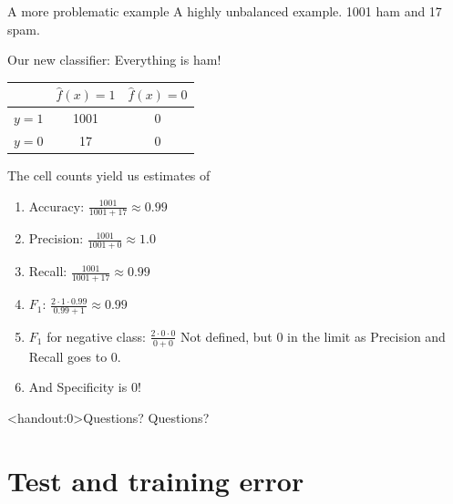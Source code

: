 \documentclass[10pt]{beamer}
\begin{document}
\begin{frame}{A more problematic example}
A highly unbalanced example. 1001 ham and 17 spam.

Our new classifier: Everything is ham!\pause

\begin{center}
\begin{tabular}{ l | c | c }
  & $\hat{f}(x)=1$ & $\hat{f}(x)=0$\\
  \hline
  $y=1$ & 1001 & 0 \\
  $y=0$ & 17 & 0 \\
  \hline
\end{tabular}
\end{center}
\pause
The cell counts yield us estimates of
\begin{enumerate}
\item Accuracy: $\frac{1001}{1001+17}\approx 0.99$
\item Precision: $\frac{1001}{1001+0}\approx 1.0$
\item Recall: $\frac{1001}{1001+17}\approx 0.99$
\item $F_1$: $\frac{2 \cdot 1 \cdot 0.99}{0.99 + 1}\approx 0.99$
\pause
\item $F_1$ for negative class: $\frac{2 \cdot 0 \cdot 0}{0 + 0}$ Not defined, but 0 in the limit as Precision and Recall goes to 0.
\item And Specificity is 0!
\end{enumerate}

\end{frame}




\begin{frame}<handout:0>{Questions?}
Questions?
\end{frame}



\section{Test and training error}
\frame{\sectionpage}
\end{document}

